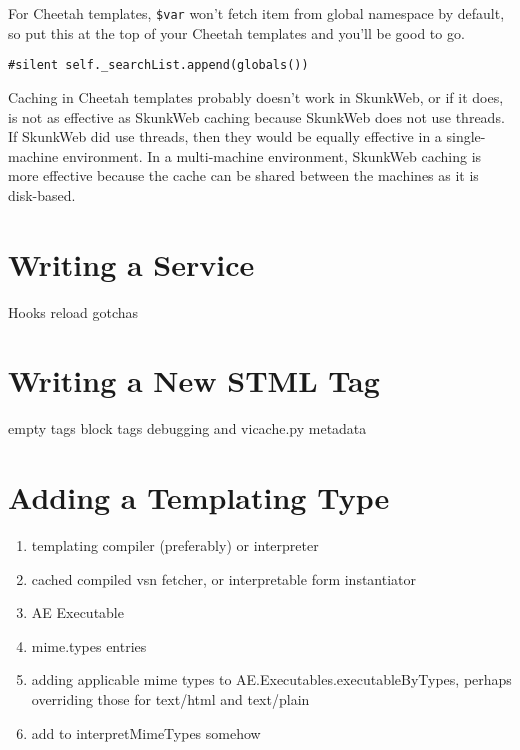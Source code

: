 \documentclass{manual}
\begin{document}
For Cheetah templates, \texttt{\$var} won't fetch item from global
namespace by default, so put this at the top of your Cheetah templates
and you'll be good to go.
\begin{verbatim}
#silent self._searchList.append(globals())
\end{verbatim}
Caching in Cheetah templates probably doesn't work in SkunkWeb, or if
it does, is not as effective as SkunkWeb caching because SkunkWeb does
not use threads.  If SkunkWeb did use threads, then they would be
equally effective in a single-machine environment.  In a multi-machine
environment, SkunkWeb caching is more effective because the cache can
be shared between the machines as it is disk-based.

\chapter{Writing a Service}
   Hooks
   reload gotchas

\chapter{Writing a New STML Tag}
   empty tags
   block tags
   debugging and vicache.py
   metadata

\chapter{Adding a Templating Type}

\begin{enumerate}
\item templating compiler (preferably) or interpreter
\item cached compiled vsn fetcher, or interpretable form instantiator
\item AE Executable
\item mime.types entries
\item adding applicable mime types to AE.Executables.executableByTypes, perhaps overriding those for text/html and text/plain
\item add to interpretMimeTypes somehow
\end{enumerate}
\end{document}
